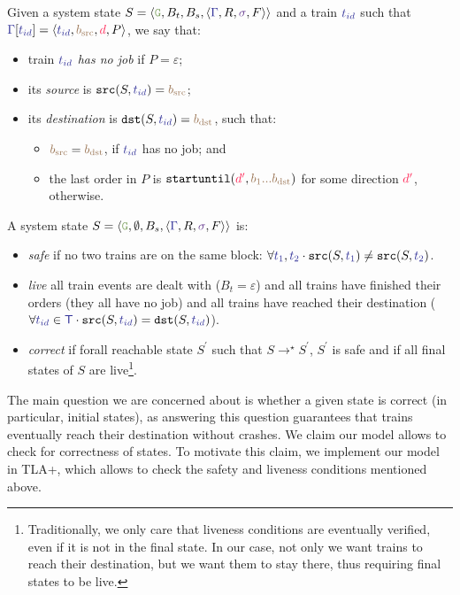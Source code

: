 \documentclass[runningheads]{llncs}
\newcommand{\tuple}[1]{\ensuremath{\langle #1\rangle}}
\newcommand{\dirFmt}[1]{{\color{dircolor} #1}}
\newcommand{\posFmt}[1]{{\color{poscolor}{#1}}}
\newcommand{\bid}[1]{\ensuremath{\posFmt{b_{#1}}}}
\newcommand{\swFmt}[1]{{\color{swcolor}{#1}}}
\newcommand{\switches}{\ensuremath{\swFmt{\sigma}}}
\newcommand{\trainFmt}[1]{{\color{traincolor} #1}}
\newcommand{\trainSeq}{\ensuremath{\trainFmt{\Gamma}}\xspace}
\newcommand{\trains}{{\trainFmt{\mathsf{T}}}}
\newcommand{\tid}[1]{\ensuremath{\trainFmt{t_{#1}}}}
\newcommand{\su}[2]{{\mbox{$\mathtt{startuntil}(\dirFmt{#1}, \posFmt{#2})$}}\xspace}
\newcommand{\emptyTrainProg}{\varepsilon}
\newcommand{\regulator}{\ensuremath{R}}
\newcommand{\signals}{\ensuremath{F}}
\newcommand{\stateTuple}[4]{\tuple{#1, #2, #3, #4}}
\newcommand{\guardFmt}[1]{{\color{guardcolor} \ensuremath{\mathtt{#1}}}}
\newcommand{\guardG}{\guardFmt{G}}
\newcommand{\bufferFmt}[1]{#1}
\newcommand{\emptyList}{\ensuremath{\varepsilon}}
\newcommand{\bufTrain}{\ensuremath{\bufferFmt{B_t}}\xspace}
\newcommand{\bufSig}{\ensuremath{\bufferFmt{B_s}}\xspace}
\newcommand{\reduces}{\ensuremath{\rightarrow}}
\newcommand{\redTuple}[4]{\ensuremath{\tuple{#1, \bufferFmt{#2}, \bufferFmt{#3}, #4}}}
\begin{document}
Given a system state  $S = \redTuple{\guardG}{\bufTrain}{\bufSig}{\stateTuple{\trainSeq{}}{\regulator}{\switches}{\signals}}$ and a train $\tid{id}$ such that $\trainSeq[\tid{id}] = \tuple{\tid{id}, \bid{\text{src}}, \dirFmt{d}, P}$, we say that:
\begin{itemize}
	\item train \tid{id} \emph{has no job} if $P = \emptyTrainProg$;
	\item its \emph{source} is $\mathtt{src}(S, \tid{id}) = \bid{\text{src}}$;
	\item its \emph{destination} is $\mathtt{dst}(S, \tid{id}) = \bid{\text{dst}}$, such that:
	\begin{itemize}
		\item $\bid{\text{src}} = \bid{\text{dst}}$, if \tid{id} has no job; and
		\item the last order in $P$ is $\su{d^\prime}{\bid{1}...\bid{\text{dst}}}$ for some direction $\dirFmt{d^\prime}$, otherwise.
	\end{itemize}
\end{itemize}

A system state $S = \redTuple{\guardG}{\emptyset}{\bufSig}{\stateTuple{\trainSeq{}}{\regulator}{\switches}{\signals}}$ is:
\begin{itemize}
	\item\emph{safe} if no two trains are on the same block: $\forall \tid{1}, \tid{2}\cdot \mathtt{src}(S, \tid{1}) \neq \mathtt{src}(S, \tid{2})$.
	\item\emph{live} all train events are dealt with ($\bufTrain = \emptyList$) and all trains have finished their orders (they all have no job) and all trains have reached their destination ($\forall \tid{id}\in\trains\cdot \mathtt{src}(S, \tid{id}) = \mathtt{dst}(S, \tid{id})$).
	\item \emph{correct} if forall reachable state $S^\prime$ such that $S\reduces^\star S^\prime$, $S^\prime$ is safe and if all final states of $S$ are live\footnote{Traditionally, we only care that liveness conditions are eventually verified, even if it is not in the final state. In our case, not only we want trains to reach their destination, but we want them to stay there, thus requiring final states to be live.}.
\end{itemize}

The main question we are concerned about is whether a given state is correct (in particular, initial states), as answering this question guarantees that trains eventually reach their destination without crashes. We claim our model allows to check for correctness of states. To motivate this claim, we implement our model in TLA+, which allows to check the safety and liveness conditions mentioned above.
\end{document}
